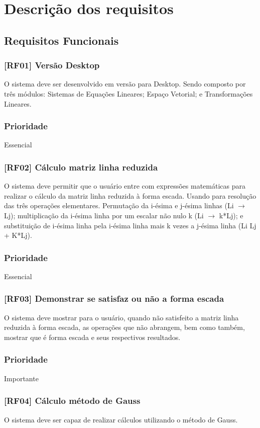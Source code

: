 \documentclass{scrreprt}
\begin{document}
\section{Descrição dos requisitos}
\subsection{Requisitos Funcionais}
\subsubsection{[RF01] Versão Desktop}
O sistema deve ser desenvolvido em versão para Desktop. Sendo composto por três módulos: Sistemas de Equações Lineares; Espaço Vetorial; e Transformações Lineares.
\subsubsection{Prioridade}
Essencial

\subsubsection{[RF02] Cálculo matriz linha reduzida}
O sistema deve permitir que o usuário entre com expressões matemáticas para realizar o cálculo da matriz linha reduzida à forma escada. Usando para resolução das três operações elementares. Permutação da i-ésima e j-ésima linhas (Li $\rightarrow$ Lj); multiplicação da i-ésima linha por um escalar não nulo k (Li $\rightarrow$ k*Lj); e substituição de i-ésima linha pela i-ésima linha mais k vezes a j-ésima linha (Li \rightarrow Lj + K*Lj).
\subsubsection{Prioridade}
Essencial

\subsubsection{[RF03] Demonstrar se satisfaz ou não a forma escada}
O sistema deve mostrar para o usuário, quando não satisfeito a matriz linha reduzida à forma escada, as operações que não abrangem, bem como também, mostrar que é forma escada e seus respectivos resultados.
\subsubsection{Prioridade}
Importante

\subsubsection{[RF04] Cálculo método de Gauss}
O sistema deve ser capaz de realizar cálculos utilizando o método de Gauss.
\end{document}

